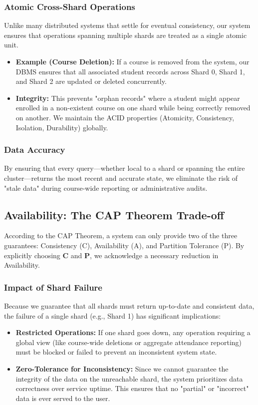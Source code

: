 \documentclass[conference]{IEEEtran}
\begin{document}
\subsubsection{Atomic Cross-Shard Operations}
Unlike many distributed systems that settle for eventual consistency, our system ensures that operations spanning multiple shards are treated as a single atomic unit. 
\begin{itemize}
    \item \textbf{Example (Course Deletion):} If a course is removed from the system, our DBMS ensures that all associated student records across Shard 0, Shard 1, and Shard 2 are updated or deleted concurrently. 
    \item \textbf{Integrity:} This prevents "orphan records" where a student might appear enrolled in a non-existent course on one shard while being correctly removed on another. We maintain the ACID properties (Atomicity, Consistency, Isolation, Durability) globally.
\end{itemize}

\subsubsection{Data Accuracy}
By ensuring that every query—whether local to a shard or spanning the entire cluster—returns the most recent and accurate state, we eliminate the risk of "stale data" during course-wide reporting or administrative audits.

\subsection{Availability: The CAP Theorem Trade-off}
According to the CAP Theorem, a system can only provide two of the three guarantees: Consistency (C), Availability (A), and Partition Tolerance (P). By explicitly choosing \textbf{C} and \textbf{P}, we acknowledge a necessary reduction in Availability.

\subsubsection{Impact of Shard Failure}
Because we guarantee that all shards must return up-to-date and consistent data, the failure of a single shard (e.g., Shard 1) has significant implications:
\begin{itemize}
    \item \textbf{Restricted Operations:} If one shard goes down, any operation requiring a global view (like course-wide deletions or aggregate attendance reporting) must be blocked or failed to prevent an inconsistent system state.
    \item \textbf{Zero-Tolerance for Inconsistency:} Since we cannot guarantee the integrity of the data on the unreachable shard, the system prioritizes data correctness over service uptime. This ensures that no "partial" or "incorrect" data is ever served to the user.
\end{itemize}
\end{document}
